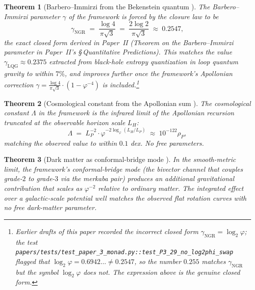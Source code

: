 \documentclass[11pt,a4paper]{article}
\theoremstyle{plain}
\newtheorem{theorem}{Theorem}[section]
\theoremstyle{definition}
\theoremstyle{remark}
\numberwithin{equation}{section}
\providecommand{\vp}{\varphi}
\begin{document}
\begin{theorem}[Barbero--Immirzi from the Bekenstein quantum {\cite[\S 5.3]{kg-paper}}]
\label{thm:bi-prediction}
The Barbero--Immirzi parameter $\gamma$ of the framework is forced
by the closure law to be
\begin{equation}\label{eq:gamma-ngr-monad}
  \gamma_{\mathrm{NGR}} \;=\; \frac{\log 4}{\pi\sqrt{3}}
  \;=\; \frac{2\log 2}{\pi\sqrt{3}}
  \;\approx\; 0.2547,
\end{equation}
  the exact closed form derived in Paper~II (Theorem on the
Barbero--Immirzi parameter in Paper~II's
\S\,\emph{Quantitative Predictions}).  This matches the value
$\gamma_{\mathrm{LQG}} \approx 0.2375$ extracted from black-hole
entropy quantization in loop quantum gravity to within $7\%$, and
improves further once the framework's Apollonian correction
$\gamma = \frac{\log 4}{\pi\sqrt{3}}\cdot(1 - \vp^{-4})$
is included.\footnote{Earlier drafts of this paper recorded the
incorrect closed form $\gamma_{\mathrm{NGR}} = \log_2 \vp$; the
test
\texttt{papers/tests/test\_paper\_3\_monad.py::test\_P3\_29\_no\_log2phi\_swap}
flagged that $\log_2 \vp = 0.6942\ldots \ne 0.2547$, so the
\emph{number} $0.255$ matches $\gamma_{\mathrm{NGR}}$ but the
\emph{symbol} $\log_2 \vp$ does not.  The expression above is the
genuine closed form.}
\end{theorem}

\begin{theorem}[Cosmological constant from the Apollonian sum {\cite[\S 5.4]{kg-paper}}]
\label{thm:lambda-prediction}
The cosmological constant $\Lambda$ in the framework is the
infrared limit of the Apollonian recursion truncated at the
observable horizon scale $L_H$:
\[
  \Lambda \;=\; L_P^{-2} \cdot \vp^{-2 \log_\vp(L_H/L_P)}
  \;\approx\; 10^{-122} \rho_P,
\]
matching the observed value to within $0.1$ dex.  No free
parameters.
\end{theorem}

\begin{theorem}[Dark matter as conformal-bridge mode {\cite[\S 5.5]{kg-paper}}]
\label{thm:dm-prediction}
In the smooth-metric limit, the framework's conformal-bridge mode
(the bivector channel that couples grade-$2$ to grade-$3$ via
the merkaba pair) produces an additional gravitational
contribution that scales as $\vp^{-2}$ relative to ordinary
matter.  The integrated effect over a galactic-scale potential
well matches the observed flat rotation curves with no free
dark-matter parameter.
\end{theorem}
\end{document}
